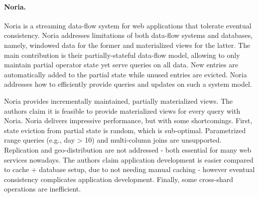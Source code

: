 

\paragraph{Noria.} Noria \cite{noria} is a streaming data-flow system for web applications that tolerate eventual consistency.
Noria addresses limitations of both data-flow systems and databases, namely, windowed data for the former and materialized views for the latter.
The main contribution is their partially-stateful data-flow model, allowing to only maintain partial operator state yet serve queries on all data.
New entries are automatically added to the partial state while unused entries are evicted.
Noria addresses how to efficiently provide queries and updates on such a system model.

Noria provides incrementally maintained, partially materialized views.
The authors claim it is feasible to provide materialized views for every query with Noria.
Noria delivers impressive performance, but with some shortcomings.
First, state eviction from partial state is random, which is sub-optimal.
Parametrized range queries (e.g., day > 10) and multi-column joins are unsupported.
Replication and geo-distribution are not addressed - both essential for many web services nowadays.
The authors claim application development is easier compared to cache + database setup, due to not needing manual caching - however eventual consistency complicates application development.
Finally, some cross-shard operations are inefficient.

